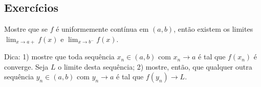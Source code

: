 \subsection*{Exercícios}

\begin{exer}
  Mostre que se $f$ é uniformemente contínua em $(a, b)$, então existem os limites $\lim_{x\to a+} f(x)$ e $\lim_{x\to b^-}f(x)$.
\end{exer}
\begin{resp}
  Dica: 1) mostre que toda sequência $x_n\in (a, b)$ com $x_n\to a$ é tal que $f(x_n)$ é converge. Seja $L$ o limite desta sequência; 2) mostre, então, que qualquer outra sequência $y_n\in (a, b)$ com $y_n\to a$ é tal que $f(y_n)\to L$.
\end{resp}

